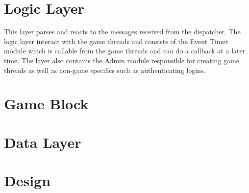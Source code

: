 


\section{Logic Layer}
This layer parses and reacts to the messages received from the dispatcher. The logic layer interact with the game threads and consists of the Event Timer module which is callable from the game threads and can do a callback at a later time. The layer also contains the Admin module responsible for creating game threads as well as non-game specifics such as authenticating logins.



\section{Game Block}


\section{Data Layer}



\section{Design}
